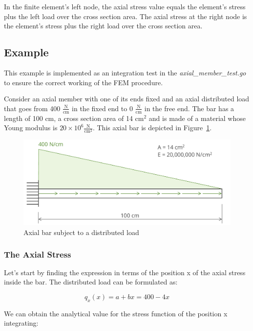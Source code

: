 In the finite element's left node, the axial stress value equals the element's stress plus the left load over the cross section area.
The axial stress at the right node is the element's stress plus the right load over the cross section area.


\subsection{Example}

This example is implemented as an integration test in the \emph{axial\_member\_test.go} to ensure the correct working of the FEM procedure.

Consider an axial member with one of its ends fixed and an axial distributed load that goes from 400 $\frac{\text{N}}{\text{cm}}$ in the fixed end to 0 $\frac{\text{N}}{\text{cm}}$ in the free end.
The bar has a length of 100 cm, a cross section area of 14 $\text{cm}^2$ and is made of a material whose Young modulus is $20 \times 10^6 \frac{\text{N}}{\text{cm}^2}$.
This axial bar is depicted in Figure~\ref{fig:axial_bar_distributed}.

\begin{figure}[h]
  \label{fig:axial_bar_distributed}
  \includegraphics[width=\linewidth]{sections/img/axial_bar_distributed.pdf}
  \caption{Axial bar subject to a distributed load}
\end{figure}

\subsubsection{The Axial Stress}

Let's start by finding the expression in terms of the position x of the axial stress inside the bar.
The distributed load can be formulated as:

\[
  q_x(x) = a + bx = 400 - 4x
\]

We can obtain the analytical value for the stress function of the position x integrating:

